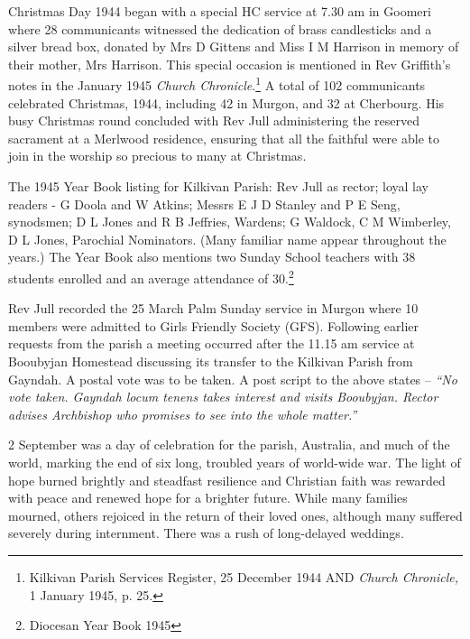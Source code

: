 Christmas Day 1944 began with a special HC service at 7.30 am in Goomeri where 28 communicants witnessed the dedication of brass candlesticks and a silver bread box, donated by Mrs D Gittens and Miss I M Harrison in memory of their mother, Mrs Harrison. This special occasion is mentioned in Rev Griffith's notes in the January 1945 \emph{Church Chronicle}.\footnote{Kilkivan Parish Services Register, 25 December 1944 AND \emph{Church Chronicle,} 1 January 1945, p. 25.} A total of 102 communicants celebrated Christmas, 1944, including 42 in Murgon, and 32 at Cherbourg. His busy Christmas round concluded with Rev Jull administering the reserved sacrament at a Merlwood residence, ensuring that all the faithful were able to join in the worship so precious to many at Christmas.


The 1945 Year Book listing for Kilkivan Parish: Rev Jull as rector; loyal lay readers - G Doola and W Atkins; Messrs E J D Stanley and P E Seng, synodsmen; D L Jones and R B Jeffries, Wardens; G Waldock, C M Wimberley, D L Jones, Parochial Nominators. (Many familiar name appear throughout the years.) The Year Book also mentions two Sunday School teachers with 38 students enrolled and an average attendance of 30.\footnote{Diocesan Year Book 1945}


Rev Jull recorded the 25 March Palm Sunday service in Murgon where 10 members were admitted to Girls Friendly Society (GFS). Following earlier requests from the parish a meeting occurred after the 11.15 am service at Booubyjan Homestead discussing its transfer to the Kilkivan Parish from Gayndah. A postal vote was to be taken. A post script to the above states -- \emph{``No vote taken. Gayndah locum tenens takes interest and visits Booubyjan. Rector advises Archbishop who promises to see into the whole matter.''}



2 September was a day of celebration for the parish, Australia, and much of the world, marking the end of six long, troubled years of world-wide war. The light of hope burned brightly and steadfast resilience and Christian faith was rewarded with peace and renewed hope for a brighter future. While many families mourned, others rejoiced in the return of their loved ones, although many suffered severely during internment. There was a rush of long-delayed weddings.









